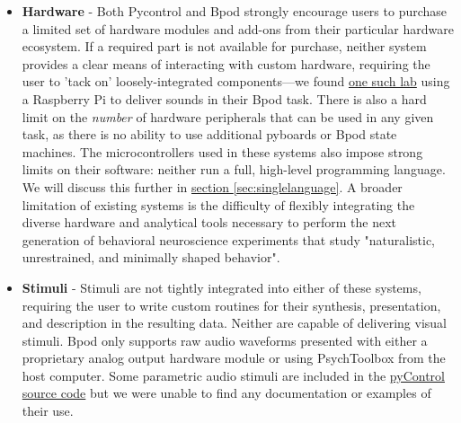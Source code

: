 \documentclass[nohyper, justified, notitlepage, marginals=raggedright,twoside=false,debug]{tufte-autopilot}
\begin{document}
\begin{itemize}[after=\vspace{-\topsep}]
    \item \textbf{Hardware} - Both Pycontrol and Bpod strongly encourage users to purchase a limited set of hardware modules and add-ons from their particular hardware ecosystem. If a required part is not available for purchase, neither system provides a clear means of interacting with custom hardware, requiring the user to 'tack on' loosely-integrated components---we found \href{https://github.com/erlichlab/BpodSoundModule}{one such lab} using a Raspberry Pi to deliver sounds in their Bpod task.   There is also a hard limit on the \textit{number} of hardware peripherals that can be used in any given task, as there is no ability to use additional pyboards or Bpod state machines. The microcontrollers used in these systems also impose strong limits on their software: neither run a full, high-level programming language. We will discuss this further in \hyperref[sec:singlelanguage]{section \ref*{sec:singlelanguage}}. A broader  limitation of existing systems is the difficulty of flexibly integrating the diverse hardware and analytical tools necessary to perform the next generation of behavioral neuroscience experiments that study "naturalistic, unrestrained, and minimally shaped behavior"\citep{dattaComputationalNeuroethologyCall2019}.
    \item \textbf{Stimuli} - Stimuli are not tightly integrated into either of these systems, requiring the user to write custom routines for their synthesis, presentation, and description in the resulting data. Neither are capable of delivering visual stimuli. Bpod only supports raw audio waveforms presented with either a proprietary analog output hardware module or using PsychToolbox from the host computer. Some parametric audio stimuli are included in the \href{https://bitbucket.org/takam/pycontrol/src/default/pyControl/audio.py}{pyControl source code} but we were unable to find any documentation or examples of their use. %
\end{itemize}\nobreak%
\end{document}

